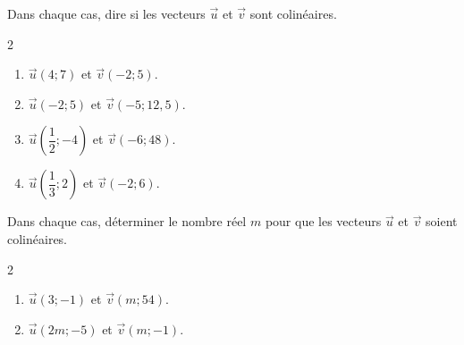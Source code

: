 {\begin{Exercice}
Dans chaque cas, dire si les vecteurs $ \overrightarrow{u} $ et $ \overrightarrow{v} $ sont colinéaires.
\vspace{-0.5cm}
\begin{multicols}{2}
\begin{enumerate}
\item $ \overrightarrow{u}(4;7) $ et $ \overrightarrow{v}(-2;5) $.
\item $ \overrightarrow{u}(-2;5) $ et $ \overrightarrow{v}(-5;12,5) $.
\item $ \overrightarrow{u}\left( \dfrac{1}{2};-4\right)  $ et $ \overrightarrow{v}(-6;48) $.
\item $ \overrightarrow{u}\left( \dfrac{1}{3};2\right)  $ et $ \overrightarrow{v}(-2;6) $.
\end{enumerate}
\end{multicols}
\end{Exercice}


\begin{Exercice}
Dans chaque cas, déterminer le nombre réel $ m $ pour que les vecteurs $ \overrightarrow{u} $ et $ \overrightarrow{v} $ soient colinéaires.
\vspace{-0.5cm}
\begin{multicols}{2}
\begin{enumerate}
\item $ \overrightarrow{u}(3;-1) $ et $ \overrightarrow{v}(m;54) $.
\item $ \overrightarrow{u}(2m;-5) $ et $ \overrightarrow{v}(m;-1) $.
\end{enumerate}
\end{multicols}
\end{Exercice}



}

